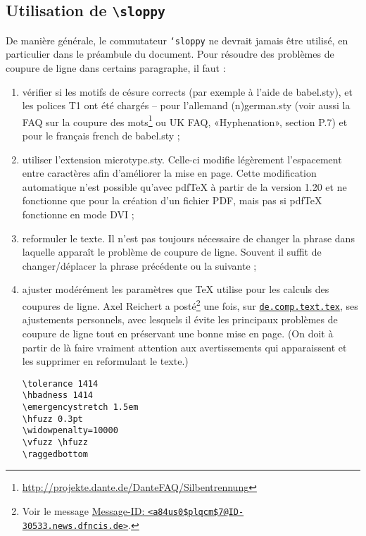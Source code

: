 \documentclass[fontsize=11pt, paper=a4, pagesize, captions=tableheading, numbers=enddot, toc=graduated, footnotes=multiple]{scrartcl}%
\providecommand{\lining}{\fontfamily{ppl}\selectfont}
\newcommand{\News}[1]{\href{news:#1}{\texttt{#1}}}
\newcommand{\MID}[2]{\href{http://groups.google.com/groups?as_umsgid=#1}%
    {Message-ID: \texttt{<#2>}}}
\newcommand{\News}[1]{\href{news:#1}{\texttt{#1}}}
\newcommand{\MID}[2]{\href{M-ID: <#1>}{Message-ID: \texttt{<#2>}}}
\DeclareRobustCommand*{\Macro}[1]{\mbox{\texttt{\char`\\#1}}}
\newcommand{\Doku}[1]{\textsf{#1}\xspace}
\newcommand{\Paket}[1]{\textsf{#1.sty}\xspace}
\newcommand{\Option}[1]{\textsf{#1}\xspace}
\newcommand{\TB}{\textbackslash}
\begin{document}
\subsection{Utilisation de \texttt{\TB sloppy}}
\label{sec:verw-von-textttt}

De manière générale, le commutateur \Macro{sloppy} ne devrait jamais être utilisé, en particulier dans le préambule du document. Pour résoudre des problèmes de coupure de ligne dans certains paragraphe, il faut :

\begin{enumerate}[\lining 1\up{o},wide]
\item vérifier si les motifs de césure corrects (par exemple à l’aide de \Paket{babel}), et les polices T1 ont été chargés – pour l'allemand \Paket{(n)german} (voir aussi la \Doku{FAQ} sur la coupure des mots\footnote{\url{http://projekte.dante.de/DanteFAQ/Silbentrennung}} ou \Doku{UK FAQ}\cite{ukfaq-13}, «Hyphenation», section P.7) et pour le français \Option{french} de \Paket{babel} ;

\item utiliser l’extension \Paket{microtype}. Celle-ci modifie légèrement l’espacement entre caractères afin d’améliorer la mise en page. Cette modification automatique n’est possible qu’avec pdf\TeX{} à partir de la version 1.20 et ne fonctionne que pour la création d’un fichier PDF, mais pas si pdf\TeX{} fonctionne en mode DVI ;

  \item reformuler le texte. Il n'est pas toujours nécessaire de changer la phrase dans laquelle apparaît le problème de coupure de ligne. Souvent il suffit de changer/déplacer la phrase précédente ou la suivante ;

\item ajuster modérément les paramètres que \TeX{} utilise pour les calculs des coupures de ligne. Axel Reichert a posté\footnote{Voir le message \MID{a84us0$plqcm$7@ID-30533.news.dfncis.de}{a84us0\$plqcm\$7@ID-30533.news.dfncis.de}.} une fois, sur \News{de.comp.text.tex}, ses ajustements personnels, avec lesquels il évite les principaux problèmes de coupure de ligne tout en préservant une bonne mise en page. (On doit à partir de là faire vraiment attention aux avertissements qui apparaissent et les supprimer en reformulant le texte.)

  \begin{minipage}[t]{0.9\linewidth}
\begin{verbatim}
\tolerance 1414
\hbadness 1414
\emergencystretch 1.5em
\hfuzz 0.3pt
\widowpenalty=10000
\vfuzz \hfuzz
\raggedbottom
\end{verbatim}
  \end{minipage}
\end{enumerate}
\end{document}
